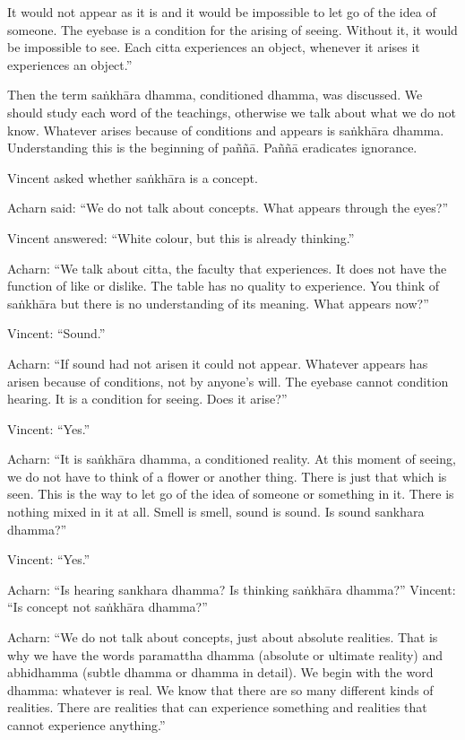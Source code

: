 It would not appear as it is and it would be impossible to let go of the idea of 
someone. The eyebase is a condition for the arising of seeing. Without it, it 
would be impossible to see. Each citta experiences an object, whenever it arises 
it experiences an object.'' 

Then the term saṅkhāra dhamma, conditioned dhamma, was discussed. We 
should study each word of the teachings, otherwise we talk about what we do 
not know. Whatever arises because of conditions and appears is saṅkhāra 
dhamma. Understanding this is the beginning of paññā. Paññā eradicates ignorance. 

Vincent asked whether saṅkhāra is a concept. 

Acharn said: ``We do not talk about concepts. What appears through the 
eyes?'' 

Vincent answered: ``White colour, but this is already thinking.'' 

Acharn: ``We talk about citta, the faculty that experiences. It does not have the 
function of like or dislike. The table has no quality to experience. You think of 
saṅkhāra but there is no understanding of its meaning. What appears now?'' 

Vincent: ``Sound.'' 

Acharn: ``If sound had not arisen it could not appear. Whatever appears has arisen because of conditions, not by anyone's will. The eyebase cannot condition 
hearing. It is a condition for seeing. Does it arise?'' 

Vincent: ``Yes.'' 

Acharn: ``It is saṅkhāra dhamma, a conditioned reality. At this moment of seeing, we do not have to think of a flower or another thing. There is just that 
which is seen. This is the way to let go of the idea of someone or something in 
it. There is nothing mixed in it at all. Smell is smell, sound is sound. Is sound 
sankhara dhamma?'' 

Vincent: ``Yes.'' 

Acharn: ``Is hearing sankhara dhamma? Is thinking saṅkhāra dhamma?'' 
Vincent: ``Is concept not saṅkhāra dhamma?'' 

Acharn: ``We do not talk about concepts, just about absolute realities. That is 
why we have the words paramattha dhamma (absolute or ultimate reality) and 
abhidhamma (subtle dhamma or dhamma in detail). We begin with the word 
dhamma: whatever is real. We know that there are so many different kinds of 
realities. There are realities that can experience something and realities that 
cannot experience anything.'' 

